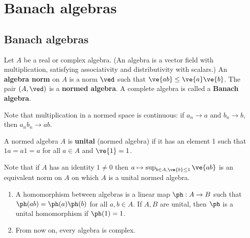 \chapter{Banach algebras}
\section{Banach algebras}

\begin{df}
Let $A$ be a real or complex algebra. (An algebra is a vector field with multiplication, satisfying associativity and distributivity with scalars.) An \textbf{algebra norm} on $A$ is a norm $\ved$ such that $\ve{ab}\le \ve{a}\ve{b}$. The pair $(A,\ved)$ is a \textbf{normed algebra}. A complete algebra is called a \textbf{Banach algebra}.
\end{df}
Note that multiplication in a normed space is continuous: if $a_n\to a$ and $b_n\to b$, then $a_nb_n\to ab$. 
\begin{df}
A normed algebra $A$ is \textbf{unital} (normed algebra) if it has an element 1 such that $1a=a1=a$ for all $a\in A$ and $\ve{1}=1$.
\end{df}
Note that if $A$ has an identity $1\ne 0$ then {$a\mapsto \sup_{b\in A,\ve{b}\le 1} \ve{ab}$} is an equivalent norm on $A$ on which $A$ is a unital normed algebra.
\begin{rem}
\begin{enumerate}
\item
A homomorphism between algebras is a linear map $\ph:A\to B$ such that $\ph(ab)=\ph(a)\ph(b)$ for all $a,b\in A$.
If $A,B$ are unital, then $\ph$ is a unital homomorphism if $\ph(1)=1$.
\item
From now on, every algebra is complex.
\end{enumerate}
\end{rem}

